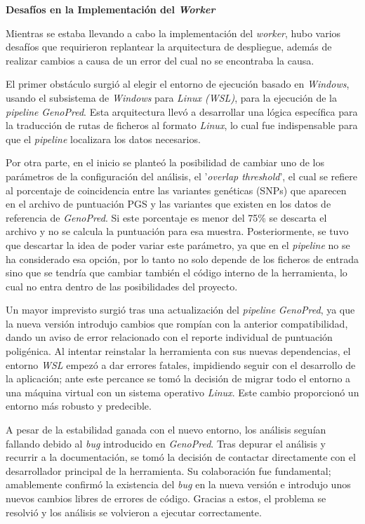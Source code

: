 \textbf{Desafíos en la Implementación del \textit{Worker}}

Mientras se estaba llevando a cabo la implementación del \textit{worker}, hubo varios desafíos que requirieron replantear la arquitectura de despliegue, además de realizar cambios a causa de un error del cual no se encontraba la causa. 

El primer obstáculo surgió al elegir el entorno de ejecución basado en \textit{Windows}, usando el subsistema de \textit{Windows} para \textit{Linux (WSL)}, para la ejecución de la \textit{pipeline} \textit{GenoPred}. Esta arquitectura llevó a desarrollar una lógica específica para la traducción de rutas de ficheros al formato \textit{Linux}, lo cual fue indispensable para que el \textit{pipeline} localizara los datos necesarios. 

Por otra parte, en el inicio se planteó la posibilidad de cambiar uno de los parámetros de la configuración del análisis, el '\textit{overlap threshold}', el cual se refiere al porcentaje de coincidencia entre las variantes genéticas (SNPs) que aparecen en el archivo de puntuación PGS y las variantes que existen en los datos de referencia de \textit{GenoPred}. Si este porcentaje es menor del 75\% se descarta el archivo y no se calcula la puntuación para esa muestra. Posteriormente, se tuvo que descartar la idea de poder variar este parámetro, ya que en el \textit{pipeline} no se ha considerado esa opción, por lo tanto no solo depende de los ficheros de entrada sino que se tendría que cambiar también el código interno de la herramienta, lo cual no entra dentro de las posibilidades del proyecto. 

Un mayor imprevisto surgió tras una actualización del \textit{pipeline} \textit{GenoPred}, ya que la nueva versión introdujo cambios que rompían con la anterior compatibilidad, dando un aviso de error relacionado con el reporte individual de puntuación poligénica. Al intentar reinstalar la herramienta con sus nuevas dependencias, el entorno \textit{WSL} empezó a dar errores fatales, impidiendo seguir con el desarrollo de la aplicación; ante este percance se tomó la decisión de migrar todo el entorno a una máquina virtual con un sistema operativo \textit{Linux}. Este cambio proporcionó un entorno más robusto y predecible. 

A pesar de la estabilidad ganada con el nuevo entorno, los análisis seguían fallando debido al \textit{bug} introducido en \textit{GenoPred}. Tras depurar el análisis y recurrir a la documentación, se tomó la decisión de contactar directamente con el desarrollador principal de la herramienta. Su colaboración fue fundamental; amablemente confirmó la existencia del \textit{bug} en la nueva versión e introdujo unos nuevos cambios libres de errores de código. Gracias a estos, el problema se resolvió y los análisis se volvieron a ejecutar correctamente.

